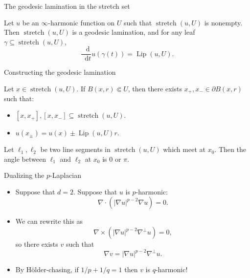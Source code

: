 \documentclass[10pt]{beamer}
\newcommand*\dif{\mathop{}\!\mathrm{d}}
\DeclareMathOperator{\Lip}{Lip}
\DeclareMathOperator{\Stretch}{stretch}
\begin{document}
\begin{frame}{The geodesic lamination in the stretch set}
\begin{theorem}
Let $u$ be an $\infty$-harmonic function on $U$ such that $\Stretch(u, U)$ is nonempty.
Then $\Stretch(u, U)$ is a geodesic lamination, and for any leaf $\gamma \subseteq \Stretch(u, U)$,
$$\frac{\dif}{\dif t} u(\gamma(t)) = \Lip(u, U).$$
\end{theorem}
\end{frame}

\begin{frame}{Constructing the geodesic lamination}
    \begin{lemma}
    Let $x \in \Stretch(u, U)$.
    If $B(x, r) \Subset U$, then there exists $x_+, x_- \in \partial B(x, r)$ such that: \pause
    \begin{itemize}
    \item $[x, x_+], [x, x_-] \subseteq \Stretch(u, U)$.
    \item $u(x_\pm) = u(x) \pm \Lip(u, U)r$. \pause
    \end{itemize}
    \end{lemma}
    
    \begin{lemma}
    Let $\ell_1, \ell_2$ be two line segments in $\Stretch(u, U)$ which meet at $x_0$. Then the angle between $\ell_1$ and $\ell_2$ at $x_0$ is $0$ or $\pi$.
    \end{lemma}
    
\end{frame}

\begin{frame}{Dualizing the $p$-Laplacian}
\begin{itemize}
\item Suppose that $d = 2$. Suppose that $u$ is $p$-harmonic:
$$\nabla \cdot (|\nabla u|^{p - 2} \nabla u) = 0.$$
\item We can rewrite this as
$$\nabla \times (|\nabla u|^{p - 2} \nabla^\perp u) = 0,$$
so there exists $v$ such that
$$\nabla v = |\nabla u|^{p - 2} \nabla^\perp u.$$
\item By H\"older-chasing, if $1/p + 1/q = 1$ then $v$ is $q$-harmonic!
\end{itemize}
\end{frame}
\end{document}
